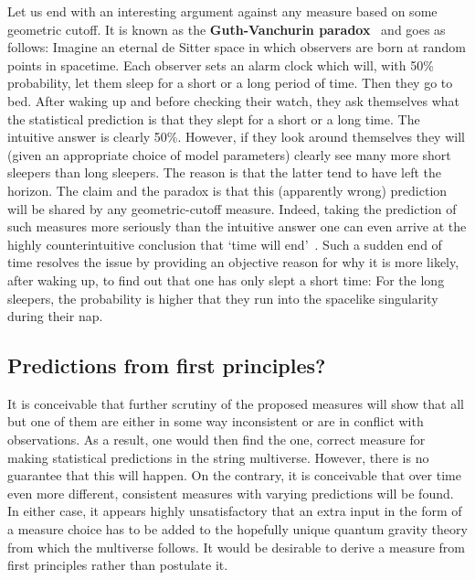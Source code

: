 \documentclass[12pt]{article}
\numberwithin{equation}{section}
\begin{document}
Let us end with an interesting argument against any measure based on some geometric cutoff. It is known as the {\bf Guth-Vanchurin paradox}~\cite{gv} and goes as follows: Imagine an eternal de Sitter space in which observers are born at random points in spacetime. Each observer sets an alarm clock which will, with 50\% probability, let them sleep for a short or a long period of time. Then they go to bed. After waking up and before checking their watch, they ask themselves what the statistical prediction is that they slept for a short or a long time. The intuitive answer is clearly 50\%. However, if they look around themselves they will (given an appropriate choice of model parameters) clearly see many more short sleepers than long sleepers. The reason is that the latter tend to have left the horizon. The claim and the paradox is that this (apparently wrong) prediction will be shared by any geometric-cutoff measure. Indeed, taking the prediction of such measures more seriously than the intuitive answer one can even arrive at the highly counterintuitive conclusion that `time will end'~\cite{Bousso:2010yn}. Such a sudden end of time resolves the issue by providing an objective reason for why it is more likely, after waking up, to find out that one has only slept a short time: For the long sleepers, the probability is higher that they run into the spacelike singularity during their nap.





\subsection{Predictions from first principles?}\label{pfp}

It is conceivable that further scrutiny of the proposed measures will show that all but one of them are either in some way inconsistent or are in conflict with observations. As a result, one would then find the one, correct measure for making statistical predictions in the string multiverse. However, there is no guarantee that this will happen. On the contrary, it is conceivable that over time even more different, consistent measures with varying predictions will be found. In either case, it appears highly unsatisfactory that an extra input in the form of a measure choice has to be added to the hopefully unique quantum gravity theory from which the multiverse follows. It would be desirable to derive a measure from first principles rather than postulate it.
\end{document}
